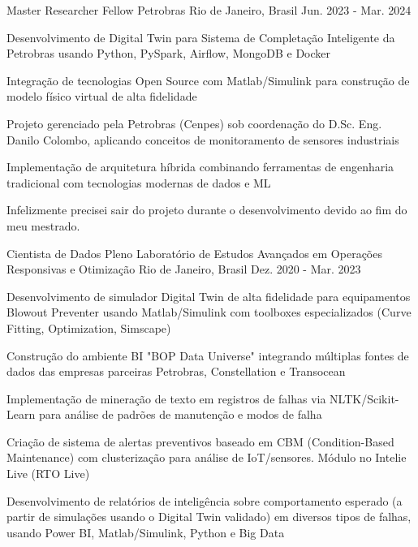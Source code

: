 \begin{cventries}
  \cventry
    {Master Researcher Fellow} %
    {Petrobras} %
    {Rio de Janeiro, Brasil} %
    {Jun. 2023 - Mar. 2024} %
    {
      \begin{cvitems} %
        \item {Desenvolvimento de Digital Twin para Sistema de Completação Inteligente da Petrobras usando Python, PySpark, Airflow, MongoDB e Docker}
        \item {Integração de tecnologias Open Source com Matlab/Simulink para construção de modelo físico virtual de alta fidelidade}
        \item {Projeto gerenciado pela Petrobras (Cenpes) sob coordenação do D.Sc. Eng. Danilo Colombo, aplicando conceitos de monitoramento de sensores industriais}
        \item {Implementação de arquitetura híbrida combinando ferramentas de engenharia tradicional com tecnologias modernas de dados e ML}
        \item {Infelizmente precisei sair do projeto durante o desenvolvimento devido ao fim do meu mestrado.}
      \end{cvitems}
    }

  \cventry
    {Cientista de Dados Pleno} %
    {Laboratório de Estudos Avançados em Operações Responsivas e Otimização} %
    {Rio de Janeiro, Brasil} %
    {Dez. 2020 - Mar. 2023} %
    {
      \begin{cvitems} %
        \item {Desenvolvimento de simulador Digital Twin de alta fidelidade para equipamentos Blowout Preventer usando Matlab/Simulink com toolboxes especializados (Curve Fitting, Optimization, Simscape)}
        \item {Construção do ambiente BI "BOP Data Universe" integrando múltiplas fontes de dados das empresas parceiras Petrobras, Constellation e Transocean}
        \item {Implementação de mineração de texto em registros de falhas via NLTK/Scikit-Learn para análise de padrões de manutenção e modos de falha}
        \item {Criação de sistema de alertas preventivos baseado em CBM (Condition-Based Maintenance) com clusterização para análise de IoT/sensores. Módulo no Intelie Live (RTO Live)}
        \item {Desenvolvimento de relatórios de inteligência sobre comportamento esperado (a partir de simulações usando o Digital Twin validado) em diversos tipos de falhas, usando  Power BI, Matlab/Simulink, Python e Big Data}
      \end{cvitems}
    }


\end{cventries}
